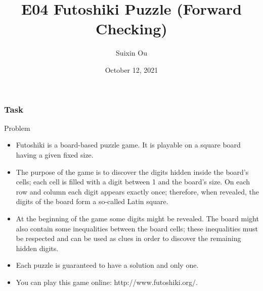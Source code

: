 \documentclass{beamer}
\title{E04 Futoshiki Puzzle (Forward Checking)}
\author{Suixin Ou} %
\institute[SYSU] %
{
  School of Computer Science\\
  Sun Yat-sen University \\ %
  \medskip
}
\date{October 12, 2021} %
\begin{document}
\begin{frame}
  \titlepage
\end{frame}

\begin{frame}
  \frametitle{Task}
  \begin{block}{Problem}
\begin{itemize}
    \item Futoshiki is a board-based puzzle game. It is playable on a square board having a given fixed size.

     \item The purpose of the game is to discover the digits hidden inside the board’s cells; each cell is filled with a digit between 1 and the board’s size. On each row and column each digit appears exactly once; therefore, when revealed, the digits of the board form a so-called Latin square.

   \item  At the beginning of the game some digits might be revealed. The board might also contain some inequalities between the board cells; these inequalities must be respected and can be used as clues in order to discover the remaining hidden digits.

   \item  Each puzzle is guaranteed to have a solution and only one.

    \item You can play this game online: http://www.futoshiki.org/.
    \end{itemize}
  \end{block}
\end{frame}
\end{document}
